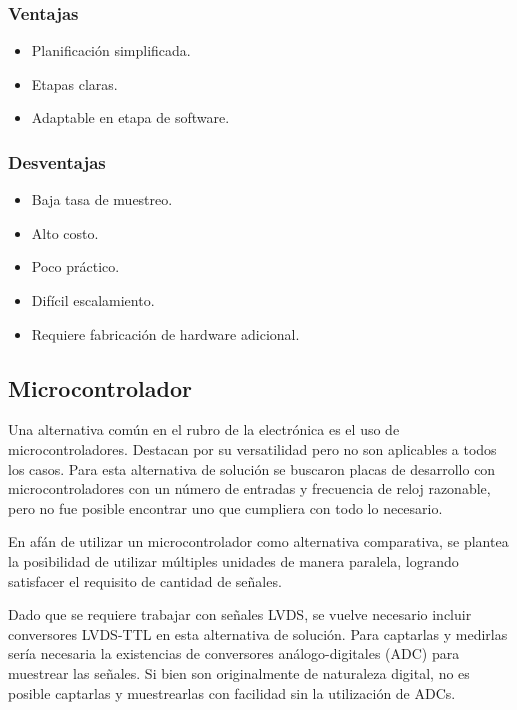 \subsubsection*{Ventajas}
\begin{itemize}
    \item Planificación simplificada.
    \item Etapas claras.
    \item Adaptable en etapa de software.
\end{itemize}


\subsubsection*{Desventajas}
\begin{itemize}
    \item Baja tasa de muestreo.
    \item Alto costo.
    \item Poco práctico.
    \item Difícil escalamiento.
    \item Requiere fabricación de hardware adicional.
\end{itemize}

\newpage
\subsection{Microcontrolador}
\label{sec:micro}
\par Una alternativa común en el rubro de la electrónica es el uso de microcontroladores. Destacan por su versatilidad pero no son aplicables a todos los casos. Para esta alternativa de solución se buscaron placas de desarrollo con microcontroladores con un número de entradas y frecuencia de reloj razonable, pero no fue posible encontrar uno que cumpliera con todo lo necesario. 
\par En afán de utilizar un microcontrolador como alternativa comparativa, se plantea la posibilidad de utilizar múltiples unidades de manera paralela, logrando satisfacer el requisito de cantidad de señales.

\par Dado que se requiere trabajar con señales LVDS, se vuelve necesario incluir conversores LVDS-TTL en esta alternativa de solución. Para captarlas y medirlas sería necesaria la existencias de conversores análogo-digitales (ADC) para muestrear las señales. Si bien son originalmente de naturaleza digital, no es posible captarlas y muestrearlas con facilidad sin la utilización de ADCs.

